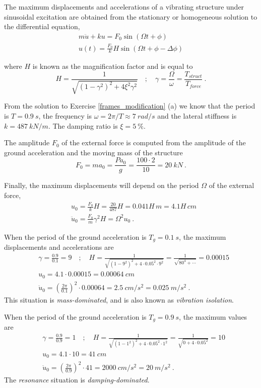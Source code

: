 \begin{Answer}[ref={frame_ground_acceleration}]
The maximum displacements and accelerations of a vibrating structure under sinusoidal excitation are obtained from the stationary or homogeneous solution to the differential equation,
\begin{align*}
m\ddot{u} + ku = F_0\sin(\Omega t + \phi) \\
u(t) = \frac{F_0}{k}H\sin(\Omega t + \phi - \Delta\phi)
\end{align*}

where $H$ is known as the magnification factor and is equal to
$$
H = \frac{1}{\sqrt{(1-\gamma^2)^2 + 4\xi^2\gamma^2}} \quad ; \quad
\gamma = \frac{\Omega}{\omega} = \frac{T_{struct}}{T_{force}}\ .
$$

From the solution to Exercise \ref{frames_modification} (a) we know that the period is $T=\SI{0.9}{s}$, the frequency is $\omega = 2\pi/T \approx \SI{7}{rad/s}$ and the lateral stiffness is $k=\SI{487}{kN/m}$. The damping ratio is $\xi=\SI{5}{\%}$.

The amplitude $F_0$ of the external force is computed from the amplitude of the ground acceleration and the moving mass of the structure
$$
F_0 = ma_{0} = \frac{Pa_0}{g} = \frac{100\cdot2}{10} = \SI{20}{kN}\ .
$$

Finally, the maximum displacements will depend on the period $\Omega$ of the external force,
\begin{align*}
&u_0 = \frac{F_0}{k}H = \frac{20}{487}H = 0.041H\,\si{m} = 4.1H\,\si{cm} \\
&\ddot{u}_0 = \frac{F_0}{m}\gamma^2H = \Omega^2u_0\ .
\end{align*}


When the period of the ground acceleration is $T_g=\SI{0.1}{s}$, the maximum displacements and accelerations are
\begin{align*}
&\gamma = \frac{0.9}{0.1} = 9 \quad ; \quad
H = \frac{1}{\sqrt{(1-9^2)^2 + 4\cdot 0.05^2\cdot 9^2}} = \frac{1}{\sqrt{80^4 + \cdots}} = 0.00015 \\
&u_0 = 4.1\cdot 0.00015 = \SI{0.00064}{cm} \\
&\ddot{u}_0 = \left(\frac{2\pi}{0.1}\right)^2 \cdot 0.00064 = \SI{2.5}{cm/s^2} = \SI{0.025}{m/s^2}\ .
\end{align*}
This situation is \emph{mass-dominated}, and is also known as \emph{vibration isolation}.

When the period of the ground acceleration is $T_g=\SI{0.9}{s}$, the maximum values are
\begin{align*}
&\gamma = \frac{0.9}{0.9} = 1 \quad ; \quad
H = \frac{1}{\sqrt{(1-1^2)^2 + 4\cdot 0.05^2\cdot 1^2}} = \frac{1}{\sqrt{0 + 4\cdot 0.05^2}} = 10 \\
&u_0 = 4.1\cdot 10 = \SI{41}{cm} \\
&\ddot{u}_0 = \left(\frac{2\pi}{0.9}\right)^2 \cdot 41 = \SI{2000}{cm/s^2} = \SI{20}{m/s^2}\ .
\end{align*}
The \emph{resonance} situation is \emph{damping-dominated}.


\end{Answer}
